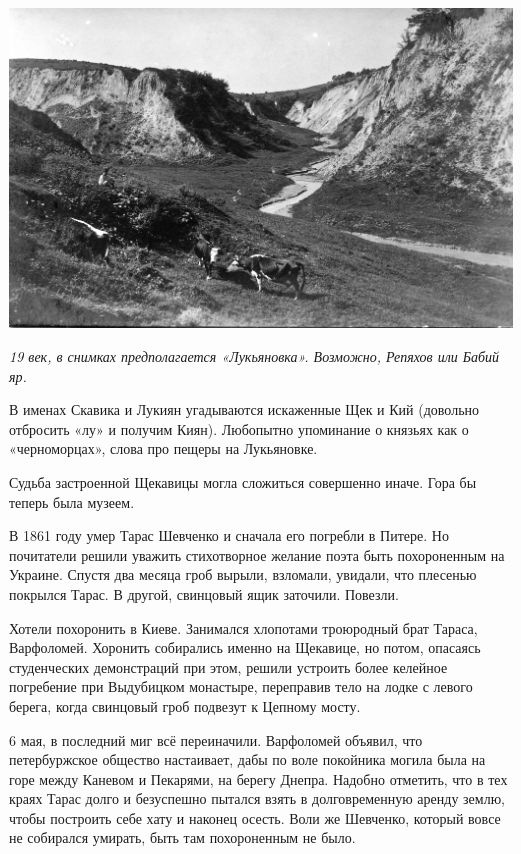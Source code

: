 \begin{center}
\includegraphics[width=\linewidth]{chast-colebanie-osnov/sheka/lukold02.jpg}

\textit{19 век, в снимках предполагается «Лукьяновка». Возможно, Репяхов или Бабий яр.}
\end{center}
\vspace*{\fill}
\newpage

В именах Скавика и Лукиян угадываются искаженные Щек и Кий (довольно отбросить «лу» и получим Киян). Любопытно упоминание о князьях как о «черноморцах», слова про пещеры на Лукьяновке.

Судьба застроенной Щекавицы могла сложиться совершенно иначе. Гора бы теперь была музеем.

В 1861 году умер Тарас Шевченко и сначала его погребли в Питере. Но почитатели решили уважить стихотворное желание поэта быть похороненным на Украине. Спустя два месяца гроб вырыли, взломали, увидали, что плесенью покрылся Тарас. В другой, свинцовый ящик заточили. Повезли.

Хотели похоронить в Киеве. Занимался хлопотами троюродный брат Тараса, Варфоломей. Хоронить собирались именно на Щекавице, но потом, опасаясь студенческих демонстраций при этом, решили устроить более келейное погребение при Выдубицком монастыре, переправив тело на лодке с левого берега, когда свинцовый гроб подвезут к Цепному мосту. 

6 мая, в последний миг всё переиначили. Варфоломей объявил, что петербуржское общество настаивает, дабы по воле покойника могила была на горе между Каневом и Пекарями, на берегу Днепра. Надобно отметить, что в тех краях Тарас долго и безуспешно пытался взять в долговременную аренду землю, чтобы построить себе хату и наконец осесть. Воли же Шевченко, который вовсе не собирался умирать, быть там похороненным не было.

